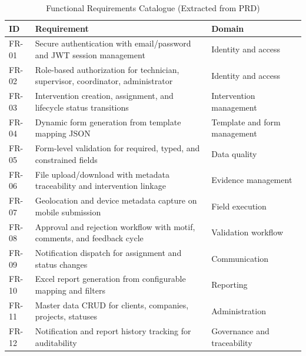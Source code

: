 \begin{table}[H]
\centering
\caption{Functional Requirements Catalogue (Extracted from PRD)}
\label{tab:functional_requirements_catalogue}
\begin{tabularx}{\textwidth}{|l|X|X|}
\hline
\textbf{ID} & \textbf{Requirement} & \textbf{Domain} \\
\hline
FR-01 & Secure authentication with email/password and JWT session management & Identity and access \\
\hline
FR-02 & Role-based authorization for technician, supervisor, coordinator, administrator & Identity and access \\
\hline
FR-03 & Intervention creation, assignment, and lifecycle status transitions & Intervention management \\
\hline
FR-04 & Dynamic form generation from template mapping JSON & Template and form management \\
\hline
FR-05 & Form-level validation for required, typed, and constrained fields & Data quality \\
\hline
FR-06 & File upload/download with metadata traceability and intervention linkage & Evidence management \\
\hline
FR-07 & Geolocation and device metadata capture on mobile submission & Field execution \\
\hline
FR-08 & Approval and rejection workflow with motif, comments, and feedback cycle & Validation workflow \\
\hline
FR-09 & Notification dispatch for assignment and status changes & Communication \\
\hline
FR-10 & Excel report generation from configurable mapping and filters & Reporting \\
\hline
FR-11 & Master data CRUD for clients, companies, projects, statuses & Administration \\
\hline
FR-12 & Notification and report history tracking for auditability & Governance and traceability \\
\hline
\end{tabularx}
\end{table}

